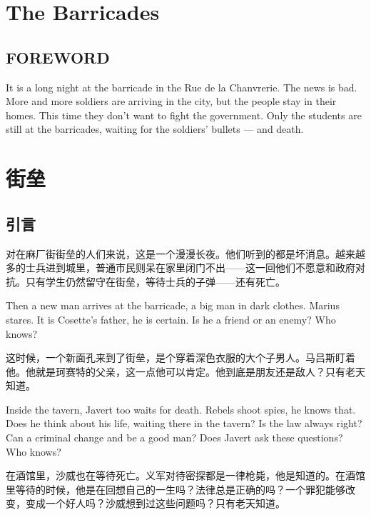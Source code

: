 \documentclass[fontset=ubuntu, zihao=5]{ctexart}
\begin{document}
\begin{paracol}{2}

  \section{The Barricades}

  \subsection*{FOREWORD}

  It is a long night at the barricade in the Rue de la Chanvrerie. The news is bad. More and more soldiers are arriving in the city, but the people stay in their homes. This time they don't want to fight the government. Only the students are still at the barricades, waiting for the soldiers' bullets --– and death.

\switchcolumn

\section*{街垒}

\subsection*{引言}

对在麻厂街街垒的人们来说，这是一个漫漫长夜。他们听到的都是坏消息。越来越多的士兵进到城里，普通市民则呆在家里闭门不出——这一回他们不愿意和政府对抗。只有学生仍然留守在街垒，等待士兵的子弹——还有死亡。

\switchcolumn*

Then a new man arrives at the barricade, a big man in dark clothes. Marius stares. It is Cosette's father, he is certain. Is he a friend or an enemy? Who knows?

\switchcolumn

这时候，一个新面孔来到了街垒，是个穿着深色衣服的大个子男人。马吕斯盯着他。他就是珂赛特的父亲，这一点他可以肯定。他到底是朋友还是敌人？只有老天知道。

\switchcolumn*

Inside the tavern, Javert too waits for death. Rebels shoot spies, he knows that. Does he think about his life, waiting there in the tavern? Is the law always right? Can a criminal change and be a good man? Does Javert ask these questions? Who knows?

\switchcolumn

在酒馆里，沙威也在等待死亡。义军对待密探都是一律枪毙，他是知道的。在酒馆里等待的时候，他是在回想自己的一生吗？法律总是正确的吗？一个罪犯能够改变，变成一个好人吗？沙威想到过这些问题吗？只有老天知道。


\end{paracol}
\end{document}
